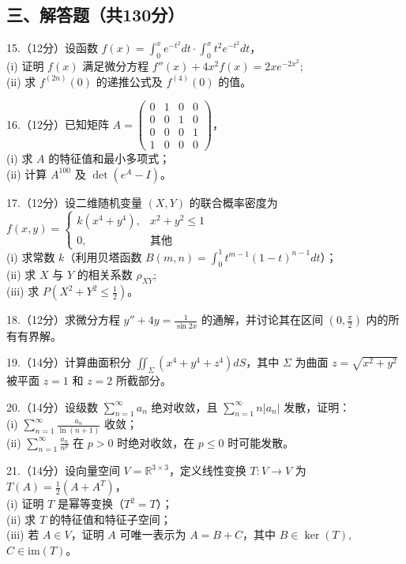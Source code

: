 \documentclass[UTF8]{ctexart}
\begin{document}
\subsection{三、解答题（共130分）}\label{ux4e09ux89e3ux7b54ux9898ux5171130ux5206uxff09}

15.（12分）设函数
\( f(x) = \int_0^x e^{-t^2} dt \cdot \int_0^x t^2 e^{-t^2} dt \)，\\
(i) 证明 \( f(x) \) 满足微分方程
\( f''(x) + 4x^2 f(x) = 2x e^{-2x^2} \);\\
(ii) 求 \( f^{(2n)}(0) \) 的递推公式及 \( f^{(4)}(0) \) 的值。

16.（12分）已知矩阵 \( A = \begin{pmatrix} 
0 & 1 & 0 & 0 \\
0 & 0 & 1 & 0 \\
0 & 0 & 0 & 1 \\
1 & 0 & 0 & 0 
\end{pmatrix} \)，\\
(i) 求 \( A \) 的特征值和最小多项式；\\
(ii) 计算 \( A^{100} \) 及 \( \det(e^A - I) \)。

17.（12分）设二维随机变量 \( (X,Y) \) 的联合概率密度为\\
\(
f(x,y) = \begin{cases} 
k(x^4 + y^4), & x^2 + y^2 \leq 1 \\
0, & 其他 
\end{cases}
\)\\
(i) 求常数 \( k \)（利用贝塔函数
\( B(m,n) = \int_0^1 t^{m-1}(1-t)^{n-1}dt \)）；\\
(ii) 求 \( X \) 与 \( Y \) 的相关系数 \( \rho_{XY} \);\\
(iii) 求 \( P(X^2 + Y^2 \leq \frac{1}{2}) \)。

18.（12分）求微分方程 \( y'' + 4y = \frac{1}{\sin 2x} \)
的通解，并讨论其在区间 \( (0,\frac{\pi}{2}) \) 内的所有有界解。

19.（14分）计算曲面积分 \( \iint_{\Sigma} (x^4 + y^4 + z^4) dS \)，其中
\( \Sigma \) 为曲面 \( z = \sqrt{x^2 + y^2} \) 被平面 \( z = 1 \) 和
\( z = 2 \) 所截部分。

20.（14分）设级数 \( \sum_{n=1}^{\infty} a_n \) 绝对收敛，且
\( \sum_{n=1}^{\infty} n|a_n| \) 发散，证明：\\
(i) \( \sum_{n=1}^{\infty} \frac{a_n}{\ln(n+1)} \) 收敛；\\
(ii) \( \sum_{n=1}^{\infty} \frac{a_n}{n^p} \) 在 \( p > 0 \)
时绝对收敛，在 \( p \leq 0 \) 时可能发散。

21.（14分）设向量空间 \( V = \mathbb{R}^{3 \times 3} \)，定义线性变换
\( T: V \to V \) 为 \( T(A) = \frac{1}{2}(A + A^T) \)，\\
(i) 证明 \( T \) 是幂等变换（\( T^2 = T \)）；\\
(ii) 求 \( T \) 的特征值和特征子空间；\\
(iii) 若 \( A \in V \)，证明 \( A \) 可唯一表示为 \( A = B + C \)，其中
\( B \in \ker(T) \), \( C \in \text{im}(T) \)。
\end{document}
